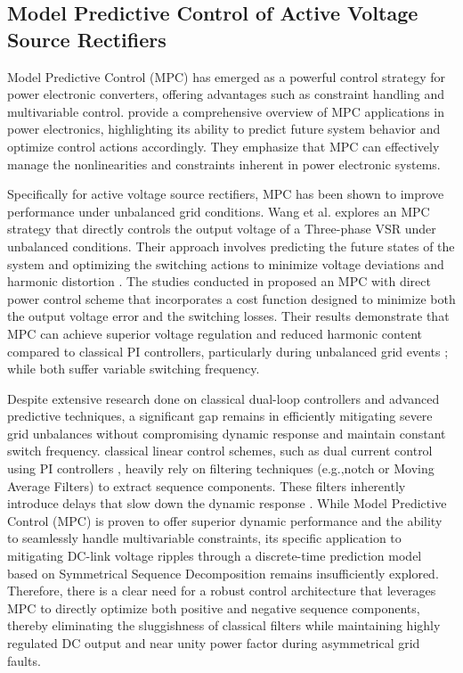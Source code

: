 \subsection{Model Predictive Control of Active Voltage Source Rectifiers}
Model Predictive Control (MPC) has emerged as a powerful control strategy for power electronic converters,
offering advantages such as constraint handling and multivariable control. \cite{rodriguez2012predictive}
provide a comprehensive overview of MPC applications in power electronics, highlighting its ability to predict
future system behavior and optimize control actions accordingly. They emphasize that MPC can effectively manage
the nonlinearities and constraints inherent in power electronic systems.\par
Specifically for active voltage source rectifiers, MPC has been shown to improve performance under unbalanced grid conditions. 
Wang et al. \cite{wang2015pid} explores an MPC strategy that directly controls the output voltage of a Three-phase VSR under 
unbalanced conditions. Their approach involves predicting the future states of the system and optimizing the switching actions
to minimize voltage deviations and harmonic distortion \cite{wang2015pid}. The studies conducted in \cite{artWangMPC,jin2018,articleKouro,articleVazquez} proposed
an MPC with direct power control scheme that incorporates a cost function designed to minimize both the output voltage error
and the switching losses. Their results demonstrate that MPC can achieve superior voltage regulation and reduced harmonic
content compared to classical PI controllers, particularly during unbalanced grid events \cite{artWangMPC}; while both suffer
variable switching frequency.\par
Despite extensive research done on classical dual-loop controllers and advanced predictive techniques, a 
significant gap remains in efficiently mitigating severe grid unbalances without compromising dynamic response and
maintain constant switch frequency. classical linear control schemes, such as dual current control using
PI controllers \cite{song1999}, heavily rely on filtering techniques (e.g.,notch or Moving Average Filters)
to extract sequence components. These filters inherently introduce delays that slow down the dynamic response \cite{mirhosseini2013,articleCichowlas}.
While Model Predictive Control (MPC) is proven to offer superior dynamic performance and the ability to seamlessly handle multivariable
constraints, its specific application to mitigating DC-link voltage ripples through a discrete-time prediction model based on
Symmetrical Sequence Decomposition remains insufficiently explored. Therefore, there is a clear need for a robust control architecture
that leverages MPC to directly optimize both positive and negative sequence components, thereby eliminating the sluggishness of
classical filters while maintaining highly regulated DC output and near unity power factor during asymmetrical grid faults.\par
